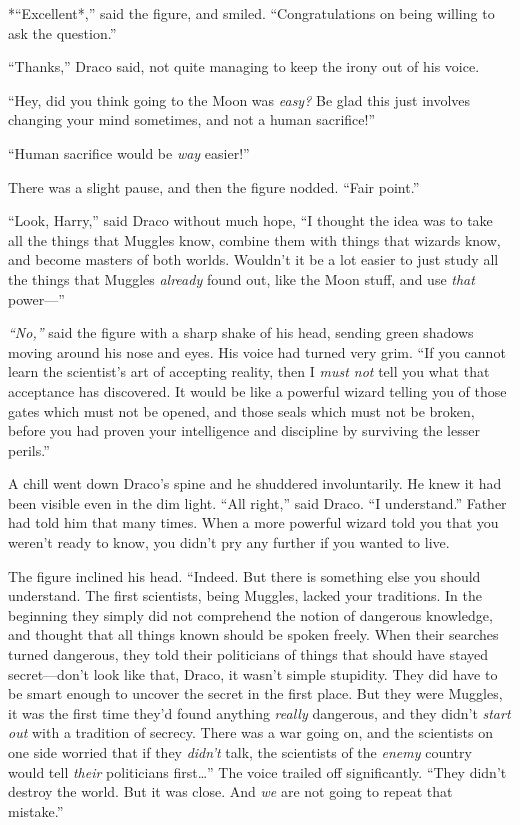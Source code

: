 *``Excellent*,'' said the figure, and smiled. ``Congratulations on being
willing to ask the question.''

``Thanks,'' Draco said, not quite managing to keep the irony out of his
voice.

``Hey, did you think going to the Moon was \emph{easy?} Be glad this
just involves changing your mind sometimes, and not a human sacrifice!''

``Human sacrifice would be \emph{way} easier!''

There was a slight pause, and then the figure nodded. ``Fair point.''

``Look, Harry,'' said Draco without much hope, ``I thought the idea was
to take all the things that Muggles know, combine them with things that
wizards know, and become masters of both worlds. Wouldn't it be a lot
easier to just study all the things that Muggles \emph{already} found
out, like the Moon stuff, and use \emph{that} power---''

\emph{``No,''} said the figure with a sharp shake of his head, sending
green shadows moving around his nose and eyes. His voice had turned very
grim. ``If you cannot learn the scientist's art of accepting reality,
then I \emph{must not} tell you what that acceptance has discovered. It
would be like a powerful wizard telling you of those gates which must
not be opened, and those seals which must not be broken, before you had
proven your intelligence and discipline by surviving the lesser
perils.''

A chill went down Draco's spine and he shuddered involuntarily. He knew
it had been visible even in the dim light. ``All right,'' said Draco.
``I understand.'' Father had told him that many times. When a more
powerful wizard told you that you weren't ready to know, you didn't pry
any further if you wanted to live.

The figure inclined his head. ``Indeed. But there is something else you
should understand. The first scientists, being Muggles, lacked your
traditions. In the beginning they simply did not comprehend the notion
of dangerous knowledge, and thought that all things known should be
spoken freely. When their searches turned dangerous, they told their
politicians of things that should have stayed secret---don't look like
that, Draco, it wasn't simple stupidity. They did have to be smart
enough to uncover the secret in the first place. But they were Muggles,
it was the first time they'd found anything \emph{really} dangerous, and
they didn't \emph{start out} with a tradition of secrecy. There was a
war going on, and the scientists on one side worried that if they
\emph{didn't} talk, the scientists of the \emph{enemy} country would
tell \emph{their} politicians first\ldots{}'' The voice trailed off
significantly. ``They didn't destroy the world. But it was close. And
\emph{we} are not going to repeat that mistake.''


